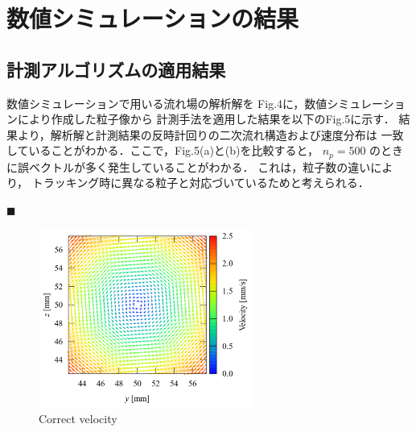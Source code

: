 \documentclass[twocolumn,a4j]{jsarticle}
\begin{document}
\section{数値シミュレーションの結果}
\subsection{計測アルゴリズムの適用結果}
数値シミュレーションで用いる流れ場の解析解を
Fig.4に，数値シミュレーションにより作成した粒子像から
計測手法を適用した結果を以下のFig.5に示す．
結果より，解析解と計測結果の反時計回りの二次流れ構造および速度分布は
一致していることがわかる．ここで，Fig.5(a)と(b)を比較すると，
$n_p=500$ のときに誤ベクトルが多く発生していることがわかる．
これは，粒子数の違いにより，
トラッキング時に異なる粒子と対応づいているためと考えられる．

\newpage
\noindent
$\blacksquare$ 
\begin{figure}[htbp]
  \footnotesize
  \begin{center}
    \includegraphics[width=70mm]{../images/velocity_correct.png}
    \caption{Correct velocity}
  \end{center}
\end{figure}
\end{document}
